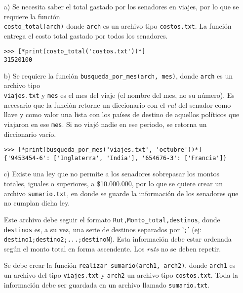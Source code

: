 \begin{enumerate}
    \item[a)] Se necesita saber el total gastado por los senadores en viajes, por lo que se requiere la función \\ \texttt{costo\_total(arch)} donde \texttt{arch} es un archivo tipo \texttt{costos.txt}. La función entrega el costo total gastado por todos los senadores.
    
    \begin{lstlisting}[style=consola]
>>> [*print(costo_total('costos.txt'))*]
31520100
    \end{lstlisting}
    
    \item[b)] Se requiere la función \texttt{busqueda\_por\_mes(arch, mes)},  donde \texttt{arch} es un archivo tipo \\ \texttt{viajes.txt} y \texttt{mes} es el mes del viaje (el nombre del mes, no su número). Es necesario que la función retorne un diccionario con el \textit{rut} del senador como llave y como valor una lista con los países de destino de aquellos políticos que viajaron en ese \texttt{mes}. Si no viajó nadie en ese periodo, se retorna un diccionario vacío.

    \begin{lstlisting}[style=consola]
>>> [*print(busqueda_por_mes('viajes.txt', 'octubre'))*]
{'9453454-6': ['Inglaterra', 'India'], '654676-3': ['Francia']}
    \end{lstlisting}
    
    \item[c)] Existe una ley que no permite a los senadores sobrepasar los montos totales, iguales o superiores, a \$10.000.000, por lo que se quiere crear un archivo \texttt{sumario.txt}, en donde se guarde la información de los senadores que no cumplan dicha ley. 
    
    Este archivo debe seguir el formato \texttt{Rut,Monto\_total,destinos}, donde \texttt{destinos} es, a su vez, una serie de destinos separados por '\texttt{;}' (ej: \texttt{destino1;destino2;...;destinoN}). Esta información debe estar ordenada según el monto total en forma ascendente. Los \textit{ruts} no se deben repetir.
    
    Se debe crear la función \texttt{realizar\_sumario(arch1, arch2)}, donde \texttt{arch1} es un archivo del tipo \texttt{viajes.txt} y \texttt{arch2} un archivo tipo \texttt{costos.txt}. Toda la información debe ser guardada en un archivo llamado \texttt{sumario.txt}.


\end{enumerate}
